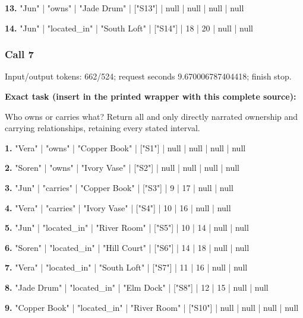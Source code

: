 \noindent\textbf{13.} "Jun" | "owns" | "Jade Drum" | ["S13"] | null | null | null | null\par\smallskip

\noindent\textbf{14.} "Jun" | "located\_in" | "South Loft" | ["S14"] | 18 | 20 | null | null\par\smallskip

\subsubsection*{Call 7}

Input/output tokens: 662/524; request seconds 9.670006787404418; finish stop.

\noindent\textbf{Exact task (insert in the printed wrapper with this complete source):}\par Who owns or carries what? Return all and only directly narrated ownership and carrying relationships, retaining every stated interval.

\noindent\textbf{1.} "Vera" | "owns" | "Copper Book" | ["S1"] | null | null | null | null\par\smallskip

\noindent\textbf{2.} "Soren" | "owns" | "Ivory Vase" | ["S2"] | null | null | null | null\par\smallskip

\noindent\textbf{3.} "Jun" | "carries" | "Copper Book" | ["S3"] | 9 | 17 | null | null\par\smallskip

\noindent\textbf{4.} "Vera" | "carries" | "Ivory Vase" | ["S4"] | 10 | 16 | null | null\par\smallskip

\noindent\textbf{5.} "Jun" | "located\_in" | "River Room" | ["S5"] | 10 | 14 | null | null\par\smallskip

\noindent\textbf{6.} "Soren" | "located\_in" | "Hill Court" | ["S6"] | 14 | 18 | null | null\par\smallskip

\noindent\textbf{7.} "Vera" | "located\_in" | "South Loft" | ["S7"] | 11 | 16 | null | null\par\smallskip

\noindent\textbf{8.} "Jade Drum" | "located\_in" | "Elm Dock" | ["S8"] | 12 | 15 | null | null\par\smallskip

\noindent\textbf{9.} "Copper Book" | "located\_in" | "River Room" | ["S10"] | null | null | null | null\par\smallskip

